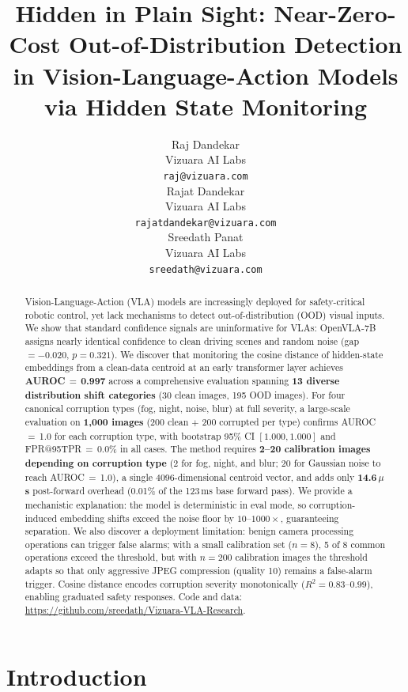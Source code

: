 \documentclass[11pt]{article}
\title{Hidden in Plain Sight: Near-Zero-Cost Out-of-Distribution Detection \\
in Vision-Language-Action Models via Hidden State Monitoring}
\author{
  Raj Dandekar \\
  Vizuara AI Labs \\
  \texttt{raj@vizuara.com} \\
  \And
  Rajat Dandekar \\
  Vizuara AI Labs \\
  \texttt{rajatdandekar@vizuara.com} \\
  \And
  Sreedath Panat \\
  Vizuara AI Labs \\
  \texttt{sreedath@vizuara.com} \\
}
\begin{document}
\maketitle

\begin{abstract}
Vision-Language-Action (VLA) models are increasingly deployed for safety-critical robotic control, yet lack mechanisms to detect out-of-distribution (OOD) visual inputs.
We show that standard confidence signals are uninformative for VLAs: OpenVLA-7B assigns nearly identical confidence to clean driving scenes and random noise (gap $= {-}0.020$, $p = 0.321$).
We discover that monitoring the cosine distance of hidden-state embeddings from a clean-data centroid at an early transformer layer achieves \textbf{AUROC\,$=$\,0.997} across a comprehensive evaluation spanning \textbf{13 diverse distribution shift categories} (30 clean images, 195 OOD images).
For four canonical corruption types (fog, night, noise, blur) at full severity, a large-scale evaluation on \textbf{1,000 images} (200 clean $+$ 200 corrupted per type) confirms AUROC\,$=$\,1.0 for each corruption type, with bootstrap 95\% CI $[1.000, 1.000]$ and FPR@95TPR\,$=$\,0.0\% in all cases.
The method requires \textbf{2--20 calibration images depending on corruption type} (2 for fog, night, and blur; 20 for Gaussian noise to reach AUROC\,$=$\,1.0), a single 4096-dimensional centroid vector, and adds only \textbf{14.6\,$\mu$s} post-forward overhead (0.01\% of the 123\,ms base forward pass).
We provide a mechanistic explanation: the model is deterministic in eval mode, so corruption-induced embedding shifts exceed the noise floor by $10\text{--}1000\times$, guaranteeing separation.
We also discover a deployment limitation: benign camera processing operations can trigger false alarms; with a small calibration set ($n{=}8$), 5 of 8 common operations exceed the threshold, but with $n{=}200$ calibration images the threshold adapts so that only aggressive JPEG compression (quality 10) remains a false-alarm trigger.
Cosine distance encodes corruption severity monotonically ($R^2 = 0.83\text{--}0.99$), enabling graduated safety responses.
Code and data: \url{https://github.com/sreedath/Vizuara-VLA-Research}.
\end{abstract}

\section{Introduction}
\label{sec:intro}
\end{document}
